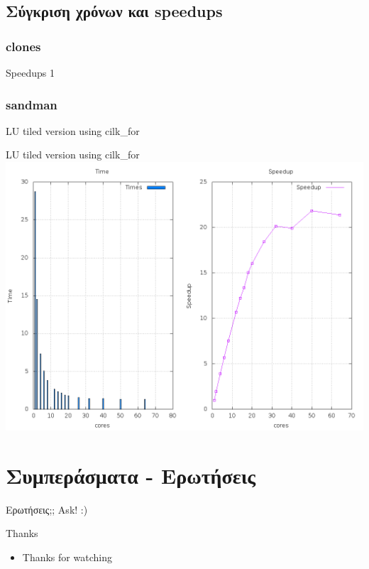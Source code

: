 \documentclass{beamer}
\begin{document}
\subsection{Σύγκριση χρόνων και speedups}
\subsubsection{clones}
\begin{frame}
    Speedups 1
\end{frame}
\subsubsection{sandman}
\begin{frame}{LU tiled version using cilk\_for}
    \begin{block}{LU tiled version using cilk\_for}
        \centering
        \includegraphics[scale=0.25]{files/sandman_tiled_cilk_for.png}
    \end{block}
\end{frame}

\section{Συμπεράσματα - Ερωτήσεις}

\begin{frame}{Ερωτήσεις;;}
    Ask! :)
\end{frame}

\begin{frame}[fragile]{Thanks}
    \begin{itemize}
        \item Thanks for watching
    \end{itemize}
\end{frame}
\end{document}
